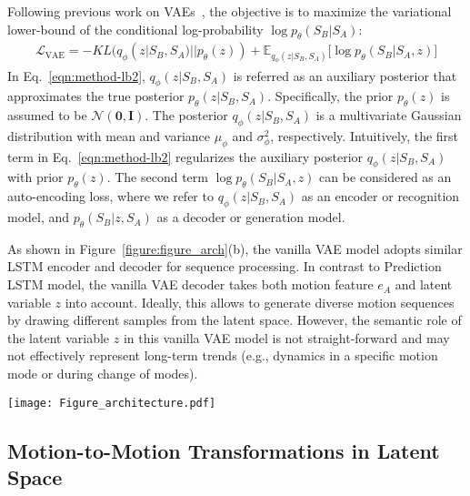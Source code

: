 \documentclass[runningheads]{llncs}
\newcommand{\cutsubsectionup}{\vspace*{-0.1in}}
\newcommand{\cutsubsectiondown}{\vspace*{-0.07in}}
\begin{document}
Following previous work on VAEs~\cite{kingma2013auto,sohn2015learning,gregor2015draw,yan2016attribute2image,walker2016uncertain,xue2016visual,walker2017pose},
the objective is to maximize the variational lower-bound of the conditional log-probability $\log p_\theta(S_B|S_A)$:
\begin{align}
\mathcal{L}_\text{VAE} = -\textit{KL}(q_\phi (z|S_B,S_A) || p_\theta (z)) + \mathbb{E}_{q_\phi (z|S_B,S_A)} \big[ \log p_\theta (S_B|S_A,z) \big]\label{eqn:method-lb2}
\end{align}
In Eq.~\ref{eqn:method-lb2}, $q_\phi(z|S_B, S_A)$ is referred as an auxiliary posterior that approximates the true posterior $p_\theta(z|S_B, S_A)$.
Specifically, the prior $p_\theta(z)$ is assumed to be $\mathcal{N}(\mathbf{0}, \mathbf{I})$.
The posterior $q_\phi(z|S_B, S_A)$ is a multivariate Gaussian distribution with mean and variance $\mu_\phi$ and $\sigma_{\phi}^2$, respectively.
Intuitively, the first term in Eq.~\ref{eqn:method-lb2} regularizes the auxiliary posterior $q_\phi(z|S_B,S_A)$ with prior $p_\theta(z)$.
The second term $\log p_\theta (S_B|S_A,z)$ can be considered as an auto-encoding loss, where we refer to $q_\phi(z|S_B, S_A)$ as an encoder or recognition model, and $p_\theta(S_B|z, S_A)$ as a decoder or generation model.


As shown in Figure~\ref{figure:figure_arch}(b), the vanilla VAE model adopts similar LSTM encoder and decoder for sequence processing. 
In contrast to Prediction LSTM model, the vanilla VAE decoder takes both motion feature $e_A$ and latent variable $z$ into account.
Ideally, this allows to generate diverse motion sequences by drawing different samples from the latent space.
However, the semantic role of the latent variable $z$ in this vanilla VAE model is not straight-forward and may not effectively represent long-term trends (e.g., dynamics in a specific motion mode or during change of modes).


\begin{figure*}[t]
\centering
\texttt{[image: Figure\_architecture.pdf]}
\caption{Illustrations of different models for motion sequence generation. $s(x_{1:T})$ indicates the hidden state of the Encoder LSTM at time $T$. 
}
\label{figure:figure_arch}
\vspace*{-0.2in}
\end{figure*}

\cutsubsectionup
\subsection{Motion-to-Motion Transformations in Latent Space}
\label{sec:tcvae_transformation}
\cutsubsectiondown
\end{document}

